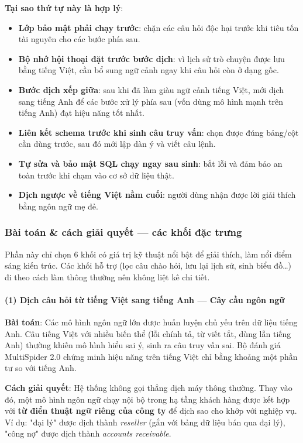 \documentclass[11pt,a4paper]{article}
\begin{document}
\textbf{Tại sao thứ tự này là hợp lý}:
\begin{itemize}
\item \textbf{Lớp bảo mật phải chạy trước}: chặn các câu hỏi độc hại trước khi tiêu tốn tài nguyên cho các bước phía sau.
\item \textbf{Bộ nhớ hội thoại đặt trước bước dịch}: vì lịch sử trò chuyện được lưu bằng tiếng Việt, cần bổ sung ngữ cảnh ngay khi câu hỏi còn ở dạng gốc.
\item \textbf{Bước dịch xếp giữa}: sau khi đã làm giàu ngữ cảnh tiếng Việt, mới dịch sang tiếng Anh để các bước xử lý phía sau (vốn dùng mô hình mạnh trên tiếng Anh) đạt hiệu năng tốt nhất.
\item \textbf{Liên kết schema trước khi sinh câu truy vấn}: chọn được đúng bảng/cột cần dùng trước, sau đó mới lập dàn ý và viết câu lệnh.
\item \textbf{Tự sửa và bảo mật SQL chạy ngay sau sinh}: bắt lỗi và đảm bảo an toàn trước khi chạm vào cơ sở dữ liệu thật.
\item \textbf{Dịch ngược về tiếng Việt nằm cuối}: người dùng nhận được lời giải thích bằng ngôn ngữ mẹ đẻ.
\end{itemize}

\subsubsection{Bài toán \& cách giải quyết --- các khối đặc trưng}

Phần này chỉ chọn 6 khối có giá trị kỹ thuật nổi bật để giải thích, làm nổi điểm sáng kiến trúc. Các khối hỗ trợ (lọc câu chào hỏi, lưu lại lịch sử, sinh biểu đồ\ldots) đi theo cách làm thông thường nên không liệt kê chi tiết.

\paragraph{(1) Dịch câu hỏi từ tiếng Việt sang tiếng Anh --- Cây cầu ngôn ngữ}

\begin{tcolorbox}[notebox]
\textbf{Bài toán}: Các mô hình ngôn ngữ lớn được huấn luyện chủ yếu trên dữ liệu tiếng Anh. Câu tiếng Việt với nhiều biến thể (lỗi chính tả, từ viết tắt, dùng lẫn tiếng Anh) thường khiến mô hình hiểu sai ý, sinh ra câu truy vấn sai. Bộ đánh giá MultiSpider 2.0 chứng minh hiệu năng trên tiếng Việt chỉ bằng khoảng một phần tư so với tiếng Anh.

\textbf{Cách giải quyết}: Hệ thống không gọi thẳng dịch máy thông thường. Thay vào đó, một mô hình ngôn ngữ chạy nội bộ trong hạ tầng khách hàng được kết hợp với \textbf{từ điển thuật ngữ riêng của công ty} để dịch sao cho khớp với nghiệp vụ. Ví dụ: "đại lý" được dịch thành \textit{reseller} (gắn với bảng dữ liệu bán qua đại lý), "công nợ" được dịch thành \textit{accounts receivable}.
\end{tcolorbox}
\end{document}
